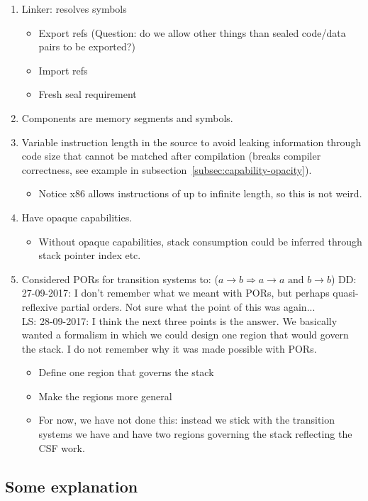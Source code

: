 \documentclass[a3paper]{article}
\newcommand\lau[1]{{\color{purple} \sf \footnotesize {LS: #1}}\\}
\newcommand\dominique[1]{{\color{purple} \sf \footnotesize {DD: #1}}\\}
\begin{document}
\begin{enumerate}
\item Linker: resolves symbols
  \begin{itemize}
  \item Export refs (Question: do we allow other things than sealed code/data pairs to be exported?)
  \item Import refs
  \item Fresh seal requirement
  \end{itemize}
\item Components are memory segments and symbols.
\item Variable instruction length in the source to avoid leaking information through code size that cannot be matched after compilation (breaks compiler correctness, see example in subsection~\ref{subsec:capability-opacity}).
  \begin{itemize}
  \item Notice x86 allows instructions of up to infinite length, so this is not weird.
  \end{itemize}
\item Have opaque capabilities.
  \begin{itemize}
  \item Without opaque capabilities, stack consumption could be inferred through stack pointer index etc.
  \end{itemize}
\item Considered PORs for transition systems to: ($a \rightarrow b \Rightarrow a \rightarrow a \text{ and } b \rightarrow b$)
  \dominique{27-09-2017: I don't remember what we meant with PORs, but perhaps quasi-reflexive partial orders.  Not sure what the point of this was again... }
  \lau{28-09-2017: I think the next three points is the answer. We basically wanted a formalism in which we could design one region that would govern the stack. I do not remember why it was made possible with PORs.}
  \begin{itemize}
  \item Define one region that governs the stack
  \item Make the regions more general
  \item For now, we have not done this: instead we stick with the transition systems we have and have two regions governing the stack reflecting the CSF work.
  \end{itemize}
\end{enumerate}

\subsection{Some explanation}
\end{document}
